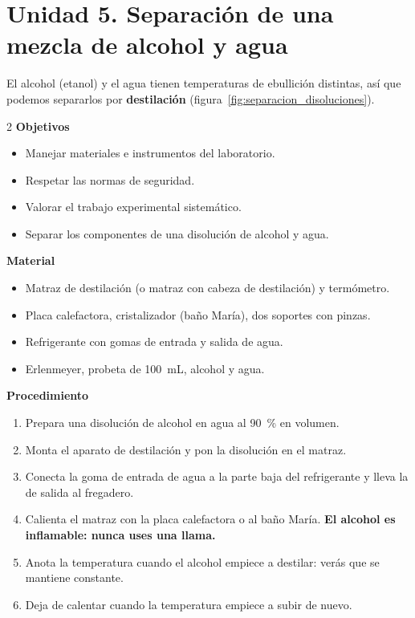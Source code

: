 \section{Unidad 5. Separación de una mezcla de alcohol y agua}

El alcohol (etanol) y el agua tienen temperaturas de ebullición distintas, así que podemos separarlos por \textbf{destilación} (figura~\ref{fig:separacion_disoluciones}).

\begin{multicols}{2}
    \textbf{Objetivos}
    \begin{itemize}
        \item Manejar materiales e instrumentos del laboratorio.
        \item Respetar las normas de seguridad.
        \item Valorar el trabajo experimental sistemático.
        \item Separar los componentes de una disolución de alcohol y agua.
    \end{itemize}
    \columnbreak
    \textbf{Material}
    \begin{itemize}
        \item Matraz de destilación (o matraz con cabeza de destilación) y termómetro.
        \item Placa calefactora, cristalizador (baño María), dos soportes con pinzas.
        \item Refrigerante con gomas de entrada y salida de agua.
        \item Erlenmeyer, probeta de \qty{100}{\mL}, alcohol y agua.
    \end{itemize}
\end{multicols}

\textbf{Procedimiento}
\begin{enumerate}[label=\numberballgreen]
    \item Prepara una disolución de alcohol en agua al \qty{90}{\percent} en volumen.
    \item Monta el aparato de destilación y pon la disolución en el matraz.
    \item Conecta la goma de entrada de agua a la parte baja del refrigerante y lleva la de salida al fregadero.
    \item Calienta el matraz con la placa calefactora o al baño María. \textbf{El alcohol es inflamable: nunca uses una llama.}
    \item Anota la temperatura cuando el alcohol empiece a destilar: verás que se mantiene constante.
    \item Deja de calentar cuando la temperatura empiece a subir de nuevo.
\end{enumerate}

